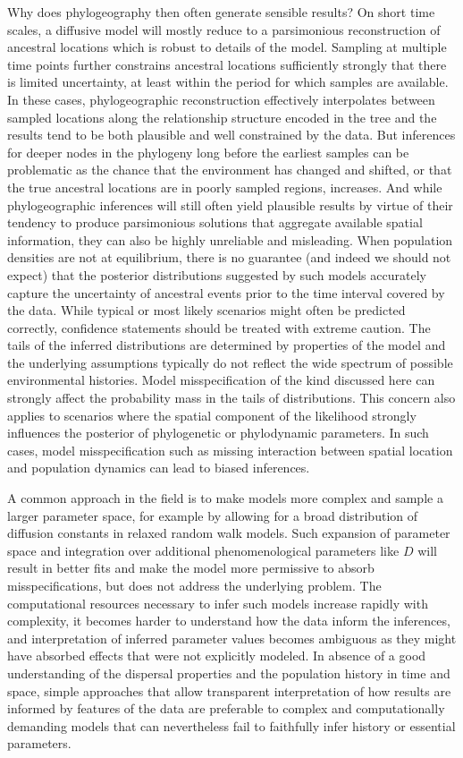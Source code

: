 \documentclass[aps,rmp, twocolumn]{revtex4}
\begin{document}
Why does phylogeography then often generate sensible results?
On short time scales, a diffusive model will mostly reduce to a parsimonious reconstruction of ancestral locations which is robust to details of the model.
Sampling at multiple time points further constrains ancestral locations sufficiently strongly that there is limited uncertainty, at least within the period for which samples are available.
In these cases, phylogeographic reconstruction effectively interpolates between sampled locations along the relationship structure encoded in the tree and the results tend to be both plausible and well constrained by the data.
But inferences for deeper nodes in the phylogeny long before the earliest samples can be problematic as the chance that the environment has changed and shifted, or that the true ancestral locations are in poorly sampled regions, increases.
And while phylogeographic inferences will still often yield plausible results by virtue of their tendency to produce parsimonious solutions that aggregate available spatial information, they can also be highly unreliable and misleading.
When population densities are not at equilibrium, there is no guarantee (and indeed we should not expect) that the posterior distributions suggested by such models accurately capture the uncertainty of ancestral events prior to the time interval covered by the data.
While typical or most likely scenarios might often be predicted correctly, confidence statements should be treated with extreme caution.
The tails of the inferred distributions are determined by properties of the model and the underlying assumptions typically do not reflect the wide spectrum of possible environmental histories. Model misspecification of the kind discussed here can strongly affect the probability mass in the tails of distributions.
This concern also applies to scenarios where the spatial component of the likelihood strongly influences the posterior of phylogenetic or phylodynamic parameters. In such cases, model misspecification such as missing interaction between spatial location and population dynamics can lead to biased inferences.

A common approach in the field is to make models more complex and sample a larger parameter space, for example by allowing for a broad distribution of diffusion constants in relaxed random walk models.
Such expansion of parameter space and integration over additional phenomenological parameters like $D$ will result in better fits and make the model more permissive to absorb misspecifications, but does not address the underlying problem.
The computational resources necessary to infer such models increase rapidly with complexity, it becomes harder to understand how the data inform the inferences, and interpretation of inferred parameter values becomes ambiguous as they might have absorbed effects that were not explicitly modeled.
In absence of a good understanding of the dispersal properties and the population history in time and space, simple approaches that allow transparent interpretation of how results are informed by features of the data are preferable to complex and computationally demanding models that can nevertheless fail to faithfully infer history or essential parameters.
\end{document}
